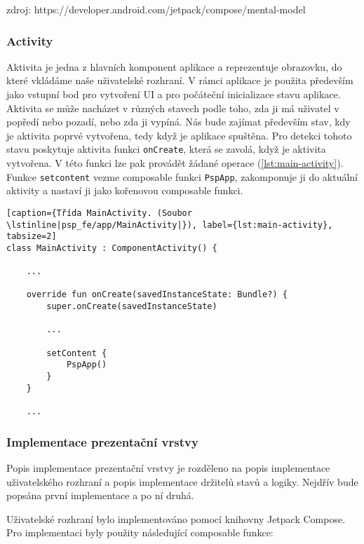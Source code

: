\noindent zdroj:
https://developer.android.com/jetpack/compose/mental-model

\subsubsection*{Activity}
Aktivita je jedna z hlavních komponent aplikace a reprezentuje obrazovku, do které vkládáme naše uživatelské rozhraní. V rámci aplikace je použita především jako vstupní bod pro vytvoření UI a pro počáteční inicializace stavu aplikace. Aktivita se může nacházet v různých stavech podle toho, zda ji má uživatel v popředí nebo pozadí, nebo zda ji vypíná. Nás bude zajímat především stav, kdy je aktivita poprvé vytvořena, tedy když je aplikace spuštěna. Pro detekci tohoto stavu poskytuje aktivita funkci \lstinline|onCreate|, která se zavolá, když je aktivita vytvořena. V této funkci lze pak provádět žádané operace (\ref{lst:main-activity}). Funkce \lstinline|setcontent| vezme composable funkci \lstinline|PspApp|, zakomponuje ji do aktuální aktivity a nastaví ji jako kořenovou composable funkci.

\begin{lstlisting}[caption={Třída MainActivity. (Soubor \lstinline|psp_fe/app/MainActivity|}), label={lst:main-activity}, tabsize=2]
class MainActivity : ComponentActivity() {

	...
	
	override fun onCreate(savedInstanceState: Bundle?) {
		super.onCreate(savedInstanceState)
		
		...
		
		setContent {
			PspApp()
		}
	}

	...
\end{lstlisting}

\subsubsection*{Implementace prezentační vrstvy}
\label{sssec:impl-ui}
Popis implementace prezentační vrstvy je rozděleno na popis implementace uživatelského rozhraní a popis implementace držitelů stavů a logiky. Nejdřív bude popsána první implementace a po ní druhá. 

Uživatelské rozhraní bylo implementováno pomocí knihovny Jetpack Compose. Pro implementaci byly použity následující composable funkce:

